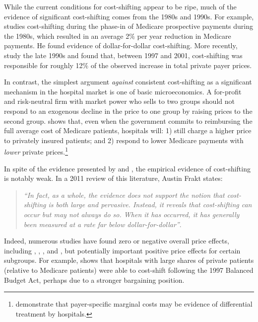 \documentclass[12pt]{article}
\begin{document}
While the current conditions for cost-shifting appear to be ripe, much of the evidence of significant cost-shifting comes from the 1980s and 1990s.  For example, \cite{cutler1998costshift} studies cost-shifting during the phase-in of Medicare prospective payments during the 1980s, which resulted in an average 2$\%$ per year reduction in Medicare payments.  He found evidence of dollar-for-dollar cost-shifting.  More recently, \cite{zwanziger2006} study the late 1990s and found that, between 1997 and 2001, cost-shifting was responsible for roughly 12$\%$ of the observed increase in total private payer prices.

In contrast, the simplest argument \textit{against} consistent cost-shifting as a significant mechanism in the hospital market is one of basic microeconomics.  A for-profit and risk-neutral firm with market power who sells to two groups should not respond to an exogenous decline in the price to one group by raising prices to the second group.  \cite{hay1983} shows that, even when the government commits to reimbursing the full average cost of Medicare patients, hospitals will: 1) still charge a higher price to privately insured patients; and 2) respond to lower Medicare payments with \textit{lower} private prices.\footnote{\cite{dor1996} demonstrate that payer-specific marginal costs may be evidence of differential treatment by hospitals.}

In spite of the evidence presented by \cite{cutler1998costshift} and \cite{zwanziger2006}, the empirical evidence of cost-shifting is notably weak.  In a 2011 review of this literature, Austin Frakt states:
\begin{quote}
\textit{``In fact, as a whole, the evidence does not support the notion that cost-shifting is both large and pervasive. Instead, it reveals that cost-shifting can occur but may not always do so. When it has occurred, it has generally been measured at a rate far below dollar-for-dollar''}.
\end{quote}

Indeed, numerous studies have found zero or negative overall price effects, including \cite{dranove2008impact}, \cite{wu2010}, \cite{frakt2014}, and \cite{dranove2017}, but potentially important positive price effects for certain subgroups. For example, \cite{wu2010} shows that hospitals with large shares of private patients (relative to Medicare patients) were able to cost-shift following the 1997 Balanced Budget Act, perhaps due to a stronger bargaining position.
\end{document}
